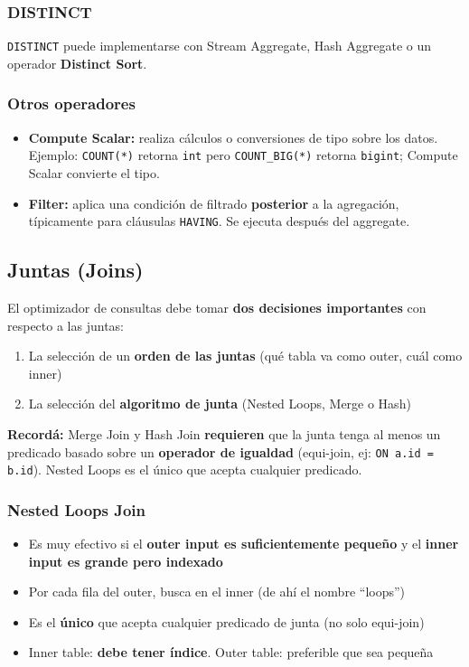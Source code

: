\documentclass[11pt, a4paper]{article}
\begin{document}
\subsubsection{DISTINCT}
\texttt{DISTINCT} puede implementarse con Stream Aggregate, Hash Aggregate o un operador \textbf{Distinct Sort}.

\subsubsection{Otros operadores}
\begin{itemize}
	\item \textbf{Compute Scalar:} realiza cálculos o conversiones de tipo sobre los datos. Ejemplo: \texttt{COUNT(*)} retorna \texttt{int} pero \texttt{COUNT\_BIG(*)} retorna \texttt{bigint}; Compute Scalar convierte el tipo.
	\item \textbf{Filter:} aplica una condición de filtrado \textbf{posterior} a la agregación, típicamente para cláusulas \texttt{HAVING}. Se ejecuta después del aggregate.
\end{itemize}

\subsection{Juntas (Joins)}

El optimizador de consultas debe tomar \textbf{dos decisiones importantes} con respecto a las juntas:
\begin{enumerate}
	\item La selección de un \textbf{orden de las juntas} (qué tabla va como outer, cuál como inner)
	\item La selección del \textbf{algoritmo de junta} (Nested Loops, Merge o Hash)
\end{enumerate}

\begin{recallbox}
	\textbf{Recordá:} Merge Join y Hash Join \textbf{requieren} que la junta tenga al menos un predicado basado sobre un \textbf{operador de igualdad} (equi-join, ej: \texttt{ON a.id = b.id}). Nested Loops es el único que acepta cualquier predicado.
\end{recallbox}

\subsubsection{Nested Loops Join}
\begin{itemize}
	\item Es muy efectivo si el \textbf{outer input es suficientemente pequeño} y el \textbf{inner input es grande pero indexado}
	\item Por cada fila del outer, busca en el inner (de ahí el nombre ``loops'')
	\item Es el \textbf{único} que acepta cualquier predicado de junta (no solo equi-join)
	\item Inner table: \textbf{debe tener índice}. Outer table: preferible que sea pequeña
\end{itemize}
\end{document}
